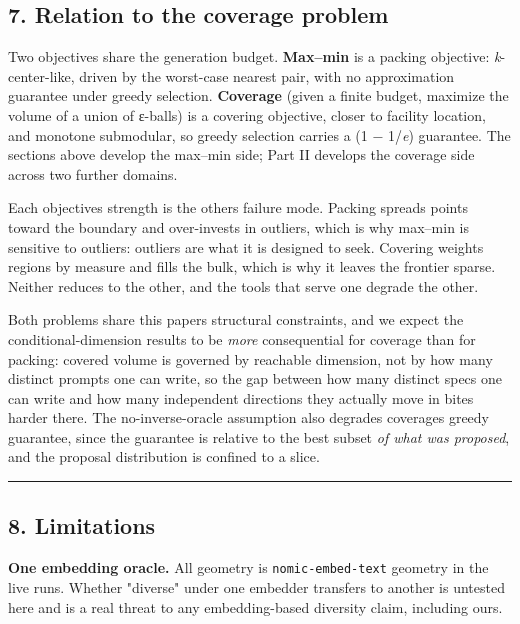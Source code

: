 \documentclass[
  11pt,
]{article}
\theoremstyle{plain}
\theoremstyle{definition}
\begin{document}
\subsection{7. Relation to the coverage
problem}\label{7-relation-to-the-coverage-problem}

Two objectives share the generation budget. \textbf{Max--min} is a
packing objective: \emph{k}-center-like, driven by the worst-case
nearest pair, with no approximation guarantee under greedy selection.
\textbf{Coverage} (given a finite budget, maximize the volume of a union
of ε-balls) is a covering objective, closer to facility location, and
monotone submodular, so greedy selection carries a (1 − 1/\emph{e})
guarantee. The sections above develop the max--min side; Part II
develops the coverage side across two further domains.

Each objective\textquotesingle s strength is the other\textquotesingle s
failure mode. Packing spreads points toward the boundary and
over-invests in outliers, which is why max--min is sensitive to
outliers: outliers are what it is designed to seek. Covering weights
regions by measure and fills the bulk, which is why it leaves the
frontier sparse. Neither reduces to the other, and the tools that serve
one degrade the other.

Both problems share this paper\textquotesingle s structural constraints,
and we expect the conditional-dimension results to be \emph{more}
consequential for coverage than for packing: covered volume is governed
by reachable dimension, not by how many distinct prompts one can write,
so the gap between how many distinct specs one can write and how many
independent directions they actually move in bites harder there. The
no-inverse-oracle assumption also degrades coverage\textquotesingle s
greedy guarantee, since the guarantee is relative to the best subset
\emph{of what was proposed}, and the proposal distribution is confined
to a slice.

\begin{center}\rule{0.5\linewidth}{0.5pt}\end{center}

\subsection{8. Limitations}\label{8-limitations}

\textbf{One embedding oracle.} All geometry is \texttt{nomic-embed-text}
geometry in the live runs. Whether "diverse" under one embedder
transfers to another is untested here and is a real threat to any
embedding-based diversity claim, including ours.
\end{document}
